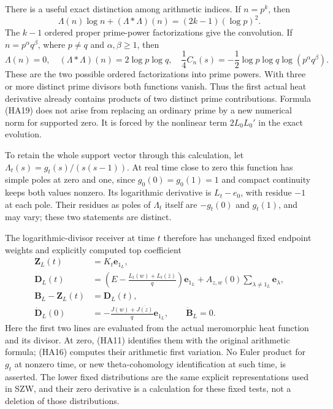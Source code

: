 \documentclass[
  10pt,
  a4paper,
]{article}
\begin{document}
There is a useful exact distinction among arithmetic indices. If
\(n=p^k\), then \[
\Lambda(n)\log n+(\Lambda*\Lambda)(n)
=(2k-1)(\log p)^2.
\tag{HA18}
\] The \(k-1\) ordered proper prime-power factorizations give the
convolution. If \(n=p^\alpha q^\beta\), where \(p\ne q\) and
\(\alpha,\beta\ge1\), then \[
\Lambda(n)=0,\quad (\Lambda*\Lambda)(n)=2\log p\log q,
\quad \frac14C_n(s)=-\frac12\log p\log q\log(p^\alpha q^\beta).
\tag{HA19}
\] These are the two possible ordered factorizations into prime powers.
With three or more distinct prime divisors both functions vanish. Thus
the first actual heat derivative already contains products of two
distinct prime contributions. Formula (HA19) does not arise from
replacing an ordinary prime by a new numerical norm for supported zero.
It is forced by the nonlinear term \(2L_0L_0'\) in the exact evolution.

To retain the whole support vector through this calculation, let
\(\Lambda_t(s)=g_t(s)/(s(s-1))\). At real time close to zero this
function has simple poles at zero and one, since \(g_0(0)=g_0(1)=1\) and
compact continuity keeps both values nonzero. Its logarithmic derivative
is \(L_t-e_0\), with residue \(-1\) at each pole. Their residues as
poles of \(\Lambda_t\) itself are \(-g_t(0)\) and \(g_t(1)\), and may
vary; these two statements are distinct.

The logarithmic-divisor receiver at time \(t\) therefore has unchanged
fixed endpoint weights and explicitly computed top coefficient \[
\begin{split}
\boldsymbol Z_L(t)&=K_t\mathbf e_{1_L},\\
\boldsymbol D_L(t)&=\left(E-\frac{L_t(w)+L_t(\bar z)}q\right)\mathbf e_{1_L}
+A_{z,w}(0)\sum_{\lambda\ne1_L}\mathbf e_\lambda,\\
\boldsymbol B_L-\boldsymbol Z_L(t)&=\boldsymbol D_L(t),\\
\dot{\boldsymbol D}_L(0)&=-\frac{J(w)+\overline{J(z)}}q\mathbf e_{1_L},
\qquad \dot{\boldsymbol B}_L=0.
\end{split}\tag{HA20}
\] Here the first two lines are evaluated from the actual meromorphic
heat function and its divisor. At zero, (HA11) identifies them with the
original arithmetic formula; (HA16) computes their arithmetic first
variation. No Euler product for \(g_t\) at nonzero time, or new
theta-cohomology identification at such time, is asserted. The lower
fixed distributions are the same explicit representations used in SZW,
and their zero derivative is a calculation for these fixed tests, not a
deletion of those distributions.
\end{document}
